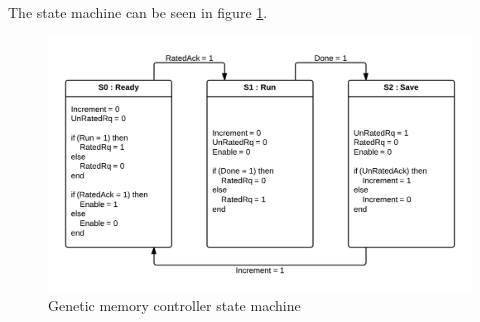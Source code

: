The state machine can be seen in figure \ref{fpga:fig:mem:genetic_memory_ctrl}.\cn


\begin{figure}

  \centering
  \includegraphics[width=\textwidth]{fpga/fig/genetic_ctrl.png}
  \caption{Genetic memory controller state machine}
  \label{fpga:fig:mem:genetic_memory_ctrl}
\end{figure}
